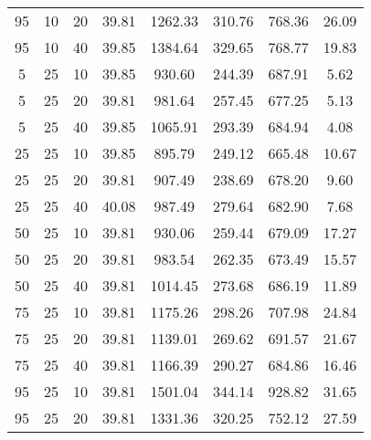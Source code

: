 \begin{table}[h]
\begin{tabular}{ccc|c|c|c|c|c}
95 & 10 & 20 & \cellcolor{gray!50}39.81 & \cellcolor{gray!1}1262.33 & \cellcolor{gray!1}310.76 & \cellcolor{gray!17}768.36 & 26.09\\
95 & 10 & 40 & \cellcolor{gray!50}39.85 & \cellcolor{gray!1}1384.64 & \cellcolor{gray!1}329.65 & \cellcolor{gray!17}768.77 & 19.83\\
5 & 25 & 10 & \cellcolor{gray!50}39.85 & \cellcolor{gray!16}930.60 & \cellcolor{gray!1}244.39 & \cellcolor{gray!42}687.91 & 5.62\\
5 & 25 & 20 & \cellcolor{gray!50}39.81 & \cellcolor{gray!8}981.64 & \cellcolor{gray!1}257.45 & \cellcolor{gray!45}677.25 & 5.13\\
5 & 25 & 40 & \cellcolor{gray!50}39.85 & \cellcolor{gray!1}1065.91 & \cellcolor{gray!1}293.39 & \cellcolor{gray!43}684.94 & 4.08\\
25 & 25 & 10 & \cellcolor{gray!50}39.85 & \cellcolor{gray!22}895.79 & \cellcolor{gray!1}249.12 & \cellcolor{gray!49}665.48 & 10.67\\
25 & 25 & 20 & \cellcolor{gray!50}39.81 & \cellcolor{gray!20}907.49 & \cellcolor{gray!1}238.69 & \cellcolor{gray!45}678.20 & 9.60\\
25 & 25 & 40 & \cellcolor{gray!48}40.08 & \cellcolor{gray!7}987.49 & \cellcolor{gray!1}279.64 & \cellcolor{gray!43}682.90 & 7.68\\
50 & 25 & 10 & \cellcolor{gray!50}39.81 & \cellcolor{gray!16}930.06 & \cellcolor{gray!1}259.44 & \cellcolor{gray!45}679.09 & 17.27\\
50 & 25 & 20 & \cellcolor{gray!50}39.81 & \cellcolor{gray!7}983.54 & \cellcolor{gray!1}262.35 & \cellcolor{gray!46}673.49 & 15.57\\
50 & 25 & 40 & \cellcolor{gray!50}39.81 & \cellcolor{gray!2}1014.45 & \cellcolor{gray!1}273.68 & \cellcolor{gray!42}686.19 & 11.89\\
75 & 25 & 10 & \cellcolor{gray!50}39.81 & \cellcolor{gray!1}1175.26 & \cellcolor{gray!1}298.26 & \cellcolor{gray!36}707.98 & 24.84\\
75 & 25 & 20 & \cellcolor{gray!50}39.81 & \cellcolor{gray!1}1139.01 & \cellcolor{gray!1}269.62 & \cellcolor{gray!41}691.57 & 21.67\\
75 & 25 & 40 & \cellcolor{gray!50}39.81 & \cellcolor{gray!1}1166.39 & \cellcolor{gray!1}290.27 & \cellcolor{gray!43}684.86 & 16.46\\
95 & 25 & 10 & \cellcolor{gray!50}39.81 & \cellcolor{gray!1}1501.04 & \cellcolor{gray!1}344.14 & \cellcolor{gray!1}928.82 & 31.65\\
95 & 25 & 20 & \cellcolor{gray!50}39.81 & \cellcolor{gray!1}1331.36 & \cellcolor{gray!1}320.25 & \cellcolor{gray!22}752.12 & 27.59\\

\end{tabular}
\end{table}
